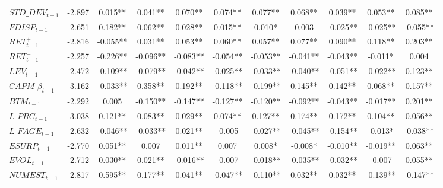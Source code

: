 \begin{landscape}
\begin{xltabular}{\linewidth}{X * {10}{S[table-format=4.3]}}
\endfoot
\bottomrule
\endlastfoot
$STD\_DEV_{t-1}$ & -2.897 & 0.015** & 0.041** & 0.070** & 0.074** & 0.077** & 0.068** & 0.039** & 0.053** & 0.085**\\
\addlinespace
$FDISP_{t-1}$ & -2.651 & 0.182** & 0.062** & 0.028** & 0.015** & 0.010* & 0.003 & -0.025** & -0.025** & -0.055**\\
\addlinespace
$RET^+_{t-1}$ & -2.816 & -0.055** & 0.031** & 0.053** & 0.060** & 0.057** & 0.077** & 0.090** & 0.118** & 0.203**\\
\addlinespace
$RET^-_{t-1}$ & -2.257 & -0.226** & -0.096** & -0.083** & -0.054** & -0.053** & -0.041** & -0.043** & -0.011* & 0.004\\
\addlinespace
$LEV_{t-1}$ & -2.472 & -0.109** & -0.079** & -0.042** & -0.025** & -0.033** & -0.040** & -0.051** & -0.022** & 0.123**\\
\addlinespace
$CAPM\_\beta_{t-1}$ & -3.162 & -0.033** & 0.358** & 0.192** & -0.118** & -0.199** & 0.145** & 0.142** & 0.068** & 0.157**\\
\addlinespace
$BTM_{t-1}$ & -2.292 & 0.005 & -0.150** & -0.147** & -0.127** & -0.120** & -0.092** & -0.043** & -0.017** & 0.201**\\
\addlinespace
$L\_PRC_{t-1}$ & -3.038 & 0.121** & 0.083** & 0.029** & 0.074** & 0.127** & 0.174** & 0.172** & 0.104** & 0.056**\\
\addlinespace
$L\_FAGE_{t-1}$ & -2.632 & -0.046** & -0.033** & 0.021** & -0.005 & -0.027** & -0.045** & -0.154** & -0.013* & -0.038**\\
\addlinespace
$ESURP_{t-1}$ & -2.770 & 0.051** & 0.007 & 0.011** & 0.007 & 0.008* & -0.008* & -0.010** & -0.019** & 0.063**\\
\addlinespace
$EVOL_{t-1}$ & -2.712 & 0.030** & 0.021** & -0.016** & -0.007 & -0.018** & -0.035** & -0.032** & -0.007 & 0.055**\\
\addlinespace
$NUMEST_{t-1}$ & -2.817 & 0.595** & 0.177** & 0.041** & -0.047** & -0.110** & 0.032** & 0.032** & -0.139** & -0.147**\\*
\end{xltabular}
\endgroup{}
\end{landscape}

